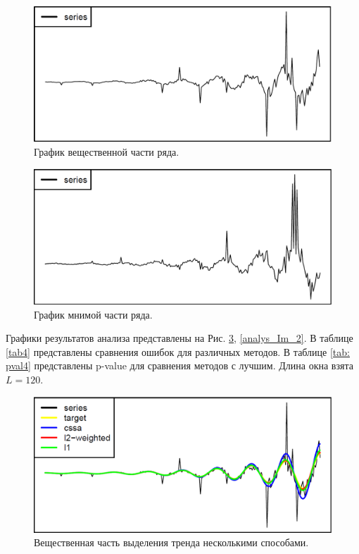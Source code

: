 \documentclass[specialist,
               substylefile = spbu.rtx,
               subf,href,colorlinks=true, 12pt]{disser}
\begin{document}
\begin{figure}[H]
	\begin{center}
		\includegraphics[width=0.67\linewidth]{ser_2_Re.png}
		\caption{График вещественной части ряда.}
		\label{ser_Re_2}
	\end{center}
\end{figure}

\begin{figure}[H]
	\begin{center}
		\includegraphics[width=0.67\linewidth]{ser_2_Im.png}
		\caption{График мнимой части ряда.}
		\label{ser_Im_2}
	\end{center}
\end{figure}

Графики результатов анализа представлены на Рис. \ref{analys_Re_2}, \ref{analys_Im_2}. В таблице \ref{tab4} представлены сравнения ошибок для различных методов. В таблице \ref{tab: pval4} представлены p-value для сравнения методов с лучшим. Длина окна взята $L = 120$.

\begin{figure}[H]
	\begin{center}
		\includegraphics[width=0.67\linewidth]{analys_2_Re.png}
		\caption{Вещественная часть выделения тренда несколькими способами.}
		\label{analys_Re_2}
	\end{center}
\end{figure}
\end{document}
